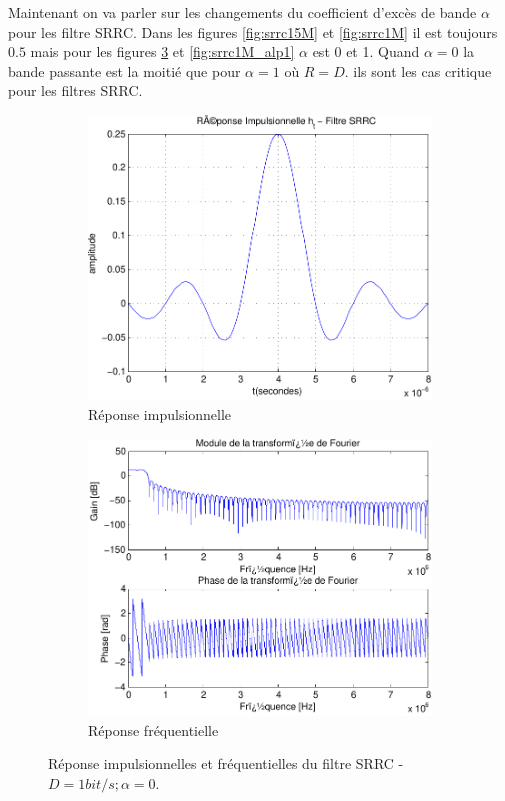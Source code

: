 \documentclass[a4paper,11pt]{article}
\begin{document}
\newpage

Maintenant on va parler sur les changements du coefficient d'excès de bande $\alpha$ pour les filtre SRRC. Dans les figures \ref{fig:srrc15M} et \ref{fig:srrc1M} il est toujours $0.5$ mais pour les figures \ref{fig:srrc1M_alp0} et \ref{fig:srrc1M_alp1} $\alpha$ est 0 et 1. Quand $\alpha=0$ la bande passante est la moitié que pour $\alpha = 1$ où $R=D$. ils sont les cas critique pour les filtres SRRC.       

\begin{figure}[htb]
	\begin{subfigure}{.5\textwidth}
  		\centering
  		\includegraphics[width=1\linewidth]{impul_srrc_alpha_0-crop.pdf}
  		\caption{Réponse impulsionnelle}
  		\label{fig:srrc_impul1M_alp0}
	\end{subfigure}
	\begin{subfigure}{.5\textwidth}
  		\centering
  		\includegraphics[width=1\linewidth]{frec_srrc_alpha_0-crop.pdf}
  		\caption{Réponse fréquentielle}
  		\label{fig:srrc_frec15M_alp0}
	\end{subfigure}%
	\caption{Réponse impulsionnelles et fréquentielles du filtre SRRC - $D=1bit/s ; \alpha =0$.}
	\label{fig:srrc1M_alp0}
\end{figure}
\end{document}
